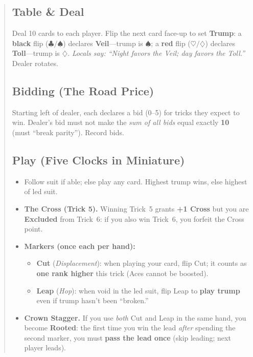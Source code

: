 \documentclass[11pt]{article}
\begin{document}
\begin{quote}
\subsection*{Table \& Deal}
Deal 10 cards to each player. Flip the next card face-up to set \textbf{Trump}:
a \textbf{black} flip ($\clubsuit/\spadesuit$) declares \textbf{Veil}—trump is $\spadesuit$;
a \textbf{red} flip ($\heartsuit/\diamondsuit$) declares \textbf{Toll}—trump is $\diamondsuit$.
\emph{Locals say: “Night favors the Veil; day favors the Toll.”} Dealer rotates.

\subsection*{Bidding (The Road Price)}
Starting left of dealer, each declares a bid (0–5) for tricks they expect to win.
Dealer’s bid must not make the \emph{sum of all bids} equal exactly \textbf{10} (must “break parity”). Record bids.

\subsection*{Play (Five Clocks in Miniature)}
\begin{itemize}[leftmargin=1.2em,itemsep=0.25em]
  \item Follow suit if able; else play any card. Highest trump wins, else highest of led suit.
  \item \textbf{The Cross (Trick 5).} Winning Trick~5 grants \textbf{+1 Cross} but you are \textbf{Excluded} from Trick~6: if you also win Trick~6, you forfeit the Cross point.
  \item \textbf{Markers (once each per hand):}
  \begin{itemize}[leftmargin=1.2em,itemsep=0.15em]
    \item \textbf{Cut} (\emph{Displacement}): when playing your card, flip Cut; it counts as \textbf{one rank higher} this trick (Aces cannot be boosted).
    \item \textbf{Leap} (\emph{Hop}): when void in the led suit, flip Leap to \textbf{play trump} even if trump hasn’t been “broken.”
  \end{itemize}
  \item \textbf{Crown Stagger.} If you use \emph{both} Cut and Leap in the same hand, you become \textbf{Rooted}: the first time you win the lead \emph{after} spending the second marker, you must \textbf{pass the lead once} (skip leading; next player leads).
\end{itemize}


\end{quote}
\end{document}
